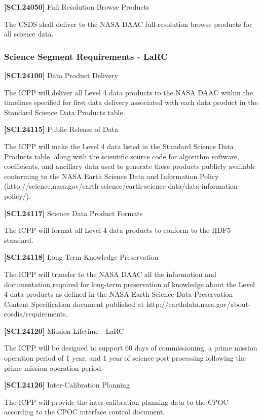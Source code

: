 \textbf{[SCI.24050]} Full Resolution Browse Products

The \gls{CSDS} shall deliver to the NASA \gls{DAAC} full-resolution browse products for all science data.

\subsubsection{Science Segment Requirements - LaRC}
\label{sciencesegmentrequirements-larc}

\textbf{[SCI.24100]} Data Product Delivery

The \gls{ICPP} will deliver all Level 4 data products to the NASA \gls{DAAC} within the timelines specified for first data delivery associated with each data product in the Standard Science Data Products table.

\textbf{[SCI.24115]} Public Release of Data

The \gls{ICPP} will make the Level 4 data listed in the Standard Science Data Products table, along with the scientific source code for algorithm software, coefficients, and ancillary data used to generate these products publicly available conforming to the NASA Earth Science Data and Information Policy (http:\slash \slash science.nasa.gov\slash earth-science\slash earth-science-data\slash data-information-policy\slash ).

\textbf{[SCI.24117]} Science Data Product Formats

The \gls{ICPP} will format all Level 4 data products to conform to the HDF5 standard.

\textbf{[SCI.24118]} Long Term Knowledge Preservation

The \gls{ICPP} will transfer to the NASA \gls{DAAC} all the information and documentation required for long-term preservation of knowledge about the Level 4 data products as defined in the NASA Earth Science Data Preservation Content Specification document published at http:\slash \slash earthdata.nasa.gov\slash about-eosdis\slash requirements.

\textbf{[SCI.24120]} Mission Lifetime - \gls{LaRC}

The \gls{ICPP} will be designed to support 60 days of commissioning, a prime mission operation period of 1 year, and 1 year of science post processing following the prime mission operation period.

\textbf{[SCI.24126]} Inter-Calibration Planning

The \gls{ICPP} will provide the inter-calibration planning data to the \gls{CPOC} according to the \gls{CPOC} interface control document.

